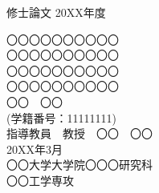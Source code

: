 \begin{titlepage}
    {\LARGE 修士論文} \hspace{\fill} {\LARGE 20XX年度}
    \vspace{1.8cm}
    \begin{center}
         {\Huge 〇〇〇〇〇〇〇〇〇〇\\[2truemm]
         〇〇〇〇〇〇〇〇〇〇\\[2truemm]
         〇〇〇〇〇〇〇〇〇〇\\[4truemm]
         〇〇〇〇〇〇〇〇〇〇} \\
        \vspace{2cm}
        {\Huge 〇〇　〇〇} \\[1truemm]
        {\LARGE (学籍番号：11111111)} \\
        \vspace{5cm}
        {\LARGE 指導教員　教授　〇〇　〇〇} \\
        \vspace{3cm}
        {\Large 20XX年3月} \\
        \vspace{1cm}
        {\LARGE 〇〇大学大学院〇〇〇研究科} \\
        {\LARGE 〇〇工学専攻} \\
    \end{center}
\end{titlepage}
